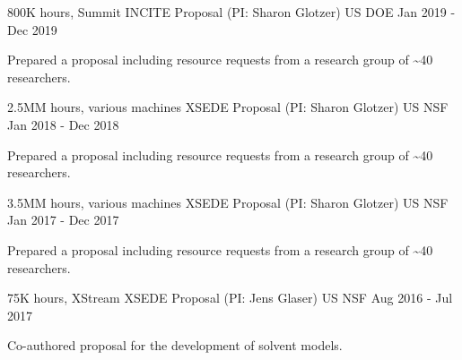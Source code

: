 
\begin{cventries}
  \cventry
    {800K hours, Summit} %
    {INCITE Proposal (PI: Sharon Glotzer)} %
    {US DOE} %
    {Jan 2019 - Dec 2019} %
    {
        \begin{cvitems}
          \item Prepared a proposal including resource requests from a research group of \textasciitilde{}40 researchers.
        \end{cvitems}
    }
  \cventry
    {2.5MM hours, various machines} %
    {XSEDE Proposal (PI: Sharon Glotzer)} %
    {US NSF} %
    {Jan 2018 - Dec 2018} %
    {
        \begin{cvitems}
          \item Prepared a proposal including resource requests from a research group of \textasciitilde{}40 researchers.
        \end{cvitems}
    }
  \cventry
    {3.5MM hours, various machines} %
    {XSEDE Proposal (PI: Sharon Glotzer)} %
    {US NSF} %
    {Jan 2017 - Dec 2017} %
    {
        \begin{cvitems}
          \item Prepared a proposal including resource requests from a research group of \textasciitilde{}40 researchers.
        \end{cvitems}
    }
  \cventry
    {75K hours, XStream} %
    {XSEDE Proposal (PI: Jens Glaser)} %
    {US NSF} %
    {Aug 2016 - Jul 2017} %
    {
        \begin{cvitems}
          \item Co-authored proposal for the development of solvent models.
        \end{cvitems}
    }
\end{cventries}

